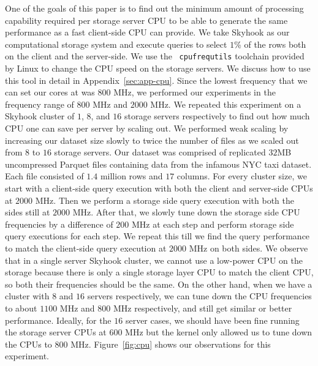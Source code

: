 \documentclass[11pt]{article}
\newcommand{\code}[1]{\colorbox{light-gray}{\texttt{#1}}}
\begin{document}
One of the goals of this paper is to find out the minimum amount of processing capability required per storage server CPU to be able to generate the same performance as a fast client-side CPU can provide. We take Skyhook as our computational storage system and execute queries to select $1$\% of the rows both on the client and the server-side. We use the ~\code{cpufrequtils} toolchain provided by Linux to change the CPU speed on the storage servers. We discuss how to use this tool in detail in Appendix~\ref{sec:app-cpu}. Since the lowest frequency that we can set our cores at was $800$ MHz, we performed our experiments in the frequency range of $800$ MHz and $2000$ MHz. We repeated this experiment on a Skyhook cluster of $1$, $8$, and $16$ storage servers respectively to find out how much CPU one can save per server by scaling out. We performed weak scaling by increasing our dataset size slowly to twice the number of files as we scaled out from $8$ to $16$ storage servers. Our dataset was comprised of replicated $32$MB uncompressed Parquet files containing data from the infamous NYC taxi dataset. Each file consisted of $1.4$ million rows and $17$ columns. For every cluster size, we start with a client-side query execution with both the client and server-side CPUs at $2000$ MHz. Then we perform a storage side query execution with both the sides still at $2000$ MHz. After that, we slowly tune down the storage side CPU frequencies by a difference of $200$ MHz at each step and perform storage side query executions for each step. We repeat this till we find the query performance to match the client-side query execution at $2000$ MHz on both sides. We observe that in a single server Skyhook cluster, we cannot use a low-power CPU on the storage because there is only a single storage layer CPU to match the client CPU, so both their frequencies should be the same. On the other hand, when we have a cluster with $8$ and $16$ servers respectively, we can tune down the CPU frequencies to about $1100$ MHz and $800$ MHz respectively, and still get similar or better performance. Ideally, for the $16$ server cases, we should have been fine running the storage server CPUs at $600$ MHz but the kernel only allowed us to tune down the CPUs to $800$ MHz. Figure~\ref{fig:cpu} shows our observations for this experiment.
\end{document}
